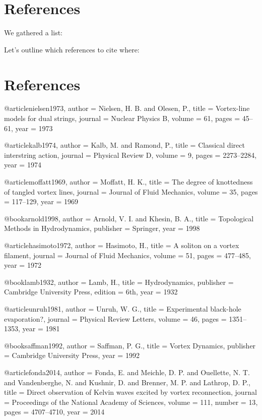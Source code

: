 \documentclass[12pt]{article}
\begin{document}
\section*{References}
We gathered a list:

Let's outline which references to cite where:

\section*{References}

@article{nielsen1973,
  author = {Nielsen, H. B. and Olesen, P.},
  title = {Vortex-line models for dual strings},
  journal = {Nuclear Physics B},
  volume = {61},
  pages = {45--61},
  year = {1973}
}

@article{kalb1974,
  author = {Kalb, M. and Ramond, P.},
  title = {Classical direct interstring action},
  journal = {Physical Review D},
  volume = {9},
  pages = {2273--2284},
  year = {1974}
}

@article{moffatt1969,
  author = {Moffatt, H. K.},
  title = {The degree of knottedness of tangled vortex lines},
  journal = {Journal of Fluid Mechanics},
  volume = {35},
  pages = {117--129},
  year = {1969}
}

@book{arnold1998,
  author = {Arnold, V. I. and Khesin, B. A.},
  title = {Topological Methods in Hydrodynamics},
  publisher = {Springer},
  year = {1998}
}

@article{hasimoto1972,
  author = {Hasimoto, H.},
  title = {A soliton on a vortex filament},
  journal = {Journal of Fluid Mechanics},
  volume = {51},
  pages = {477--485},
  year = {1972}
}

@book{lamb1932,
  author = {Lamb, H.},
  title = {Hydrodynamics},
  publisher = {Cambridge University Press},
  edition = {6th},
  year = {1932}
}

@article{unruh1981,
  author = {Unruh, W. G.},
  title = {Experimental black-hole evaporation?},
  journal = {Physical Review Letters},
  volume = {46},
  pages = {1351--1353},
  year = {1981}
}

@book{saffman1992,
  author = {Saffman, P. G.},
  title = {Vortex Dynamics},
  publisher = {Cambridge University Press},
  year = {1992}
}

@article{fonda2014,
  author = {Fonda, E. and Meichle, D. P. and Ouellette, N. T. and Vandenberghe, N. and Kushnir, D. and Brenner, M. P. and Lathrop, D. P.},
  title = {Direct observation of Kelvin waves excited by vortex reconnection},
  journal = {Proceedings of the National Academy of Sciences},
  volume = {111},
  number = {13},
  pages = {4707--4710},
  year = {2014}
}
\end{document}
